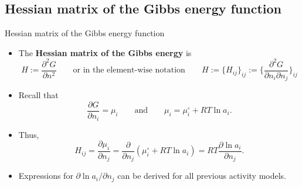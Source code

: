 \subsection{Hessian matrix of the Gibbs energy function}
%
\begin{frame}{Hessian matrix of the Gibbs energy function}
\begin{itemize}
\item The \alert{\bf Hessian matrix of the Gibbs energy} is
\[
H :=\frac{\partial^{2}G}{\partial n^{2}} 
\qquad\text{or in the  element-wise notation}\qquad 
H :=\big\{ H_{ij} \big\}_{ij} 
:= \Bigg\{ \frac{\partial^{2}G}{\partial n_{i}\partial n_{j}}\Bigg\}_{ij} 
\]
\item Recall that
\[
\frac{\partial G}{\partial n_{i}}=\mu_{i}\qquad\text{and}\qquad\mu_{i}=\mu_{i}^{\circ}+RT\ln a_{i}.
\]
\item Thus, 
\[
H_{ij}=\frac{\partial\mu_{i}}{\partial n_{j}}=\frac{\partial}{\partial n_{j}}\left(\mu_{i}^{\circ}+RT\ln a_{i}\right)=RT\frac{\partial\ln a_{i}}{\partial n_{j}}.
\]
\item Expressions for \alert{$\partial\ln a_{i}/\partial n_{j}$ can be derived
for all previous activity models}.
\end{itemize}
\end{frame}
%
